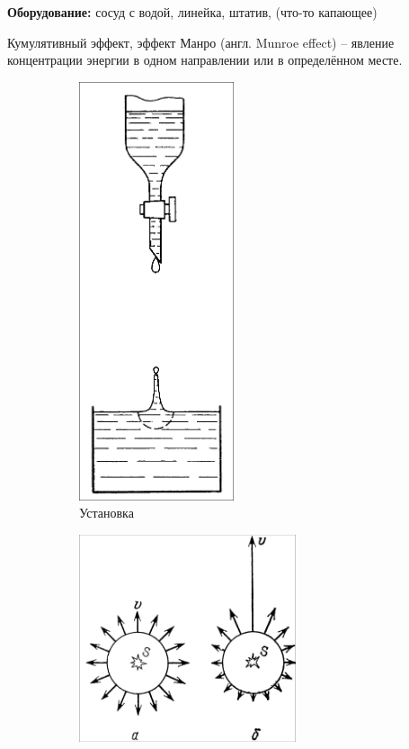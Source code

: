 \documentclass[a4paper, 12pt]{article}
\begin{document}
\noindent \textbf{Оборудование:}
сосуд с водой, линейка, штатив, (что-то капающее)

\bigskip

Кумулятивный эффект, эффект Манро (англ. Munroe effect) -- явление
концентрации энергии в одном направлении или в определённом месте.

\begin{figure}[H]
    \begin{subfigure}{0.3\textwidth}
        \centering
        \includegraphics[width=0.5\textwidth]{img/Experiment Scheme.png}
        \caption*{Установка}
    \end{subfigure}%
    \begin{subfigure}{0.5\textwidth}
        \centering
        \includegraphics[width=0.7\textwidth]{img/Cumulative effect.png}

\end{subfigure}
\end{figure}
\end{document}
